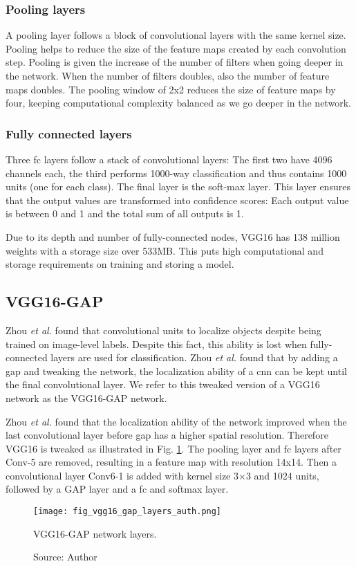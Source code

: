 \subsubsection{Pooling layers}
A pooling layer follows a block of convolutional layers with the same kernel size. Pooling helps to reduce the size of the feature maps created by each convolution step. Pooling is given the increase  of the number of filters when going deeper in the network. When the number of filters doubles, also the number of feature maps doubles. The pooling window of 2x2 reduces the size of feature maps by four, keeping computational complexity balanced as we go deeper in the network.

\subsubsection{Fully connected layers}
Three \acrshort{fc} layers follow a stack of convolutional layers: The first two have 4096 channels each, the third performs 1000-way  classification and thus contains 1000 units (one for each class). The final layer is the soft-max layer. This layer ensures that the output values are transformed into confidence scores: Each output value is between 0 and 1 and the total sum of all outputs is 1.

Due to its depth and number of fully-connected nodes, VGG16 has 138 million weights with a storage size over 533MB. This puts high computational and storage requirements on training and storing a model.

\subsection{VGG16-GAP}
Zhou \textit{et al.} \cite{zhou2016cvpr} found that convolutional units to localize objects despite being trained on image-level labels. Despite this fact, this ability is lost when fully-connected layers are used for classification. Zhou \textit{et al.} found that by adding a \acrshort{gap} and tweaking the network, the localization ability of a \acrshort{cnn} can be kept until the final convolutional layer. We refer to this tweaked version of a VGG16 network as the VGG16-GAP network.

Zhou \textit{et al.} found that the localization ability of the network improved when the last convolutional layer before \acrshort{gap} has a higher spatial resolution. Therefore VGG16 is tweaked as illustrated in Fig. \ref{fig:vgg16_gap_layers_auth}. The pooling layer and \acrshort{fc} layers after Conv-5 are removed, resulting in a feature map with resolution 14x14. Then a convolutional layer Conv6-1 is added with kernel size 3×3 and 1024 units, followed by a GAP layer and a \acrshort{fc} and softmax layer.
\begin{figure}[ht]
    \begin{center}       
    \texttt{[image: fig\_vgg16\_gap\_layers\_auth.png]}
    \caption[VGG16-GAP network layers]{VGG16-GAP network layers.}
    \caption*{Source: Author}
    \label{fig:vgg16_gap_layers_auth}
    \end{center}
\end{figure}

